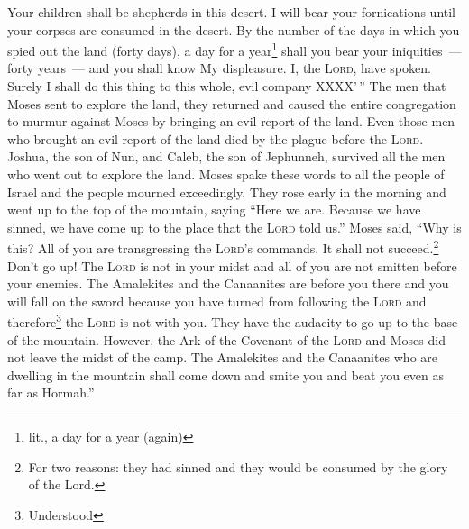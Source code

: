 \begin{enumerate*}[mode=unboxed]
     Your children shall be shepherds in this desert. I will bear your fornications until your corpses are consumed in the desert.%
     By the number of the days in which you spied out the land (forty days), a day for a year\footnote{lit., a day for a year (again)} shall you bear your iniquities~--- forty years~--- and you shall know My displeasure.%
     I, the \textsc{Lord}, have spoken. Surely I shall do this thing to this whole, evil company XXXX'\,''%
     The men that Moses sent to explore the land, they returned and caused the entire congregation to murmur against Moses by bringing an evil report of the land.%
     Even those men who brought an evil report of the land died by the plague before the \textsc{Lord}.%
     Joshua, the son of Nun, and Caleb, the son of Jephunneh, survived all the men who went out to explore the land.%
     Moses spake these words to all the people of Israel and the people mourned exceedingly.%
     They rose early in the morning and went up to the top of the mountain, saying ``Here we are. Because we have sinned, we have come up to the place that the \textsc{Lord} told us.''%
     Moses said, ``Why is this? All of you are transgressing the \textsc{Lord}'s commands. It shall not succeed.\footnote{For two reasons: they had sinned and they would be consumed by the glory of the Lord.}%
     Don't go up! The \textsc{Lord} is not in your midst and all of you are not smitten before your enemies.%
     The Amalekites and the Canaanites are before you there and you will fall on the sword because you have turned from following the \textsc{Lord} and therefore\footnote{Understood} the \textsc{Lord} is not with you.%
     They have the audacity to go up to the base of the mountain. However, the Ark of the Covenant of the \textsc{Lord} and Moses did not leave the midst of the camp.%
     The Amalekites and the Canaanites who are dwelling in the mountain shall come down and smite you and beat you even as far as Hormah.''%
\end{enumerate*}
